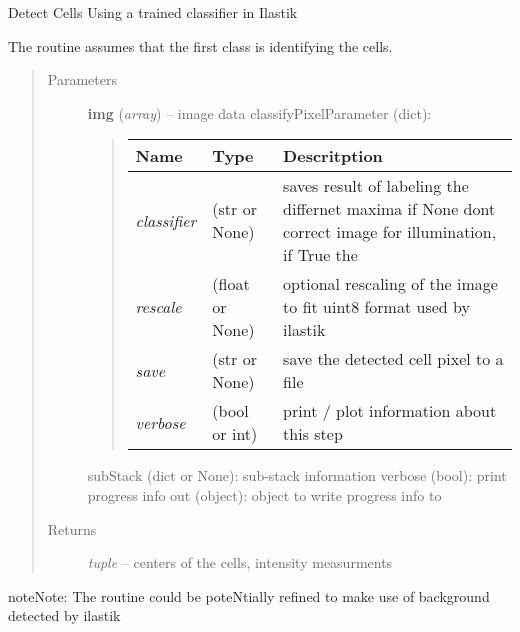 \documentclass[letterpaper,10pt,english]{sphinxmanual}
\begin{document}

\begin{fulllineitems}
\label{api/ClearMap.ImageProcessing:ClearMap.ImageProcessing.IlastikClassification.classifyCells}
Detect Cells Using a trained classifier in Ilastik

The routine assumes that the first class is identifying the cells.
\begin{quote}\begin{description}
\item[{Parameters}] \leavevmode
\textbf{img} (\emph{array}) --
image data
classifyPixelParameter (dict):
\begin{quote}

\begin{tabulary}{\linewidth}{|L|L|L|}
\hline
\textsf{\relax 
Name
} & \textsf{\relax 
Type
} & \textsf{\relax 
Descritption
}\\
\hline
\emph{classifier}
 & 
(str or  None)
 & 
saves result of labeling the differnet maxima
if None dont correct image for illumination, if True the
\\
\hline
\emph{rescale}
 & 
(float or None)
 & 
optional rescaling of the image to fit uint8 format
used by ilastik
\\
\hline
\emph{save}
 & 
(str or None)
 & 
save the detected cell pixel to a file
\\
\hline
\emph{verbose}
 & 
(bool or int)
 & 
print / plot information about this step
\\
\hline\end{tabulary}

\end{quote}

subStack (dict or None): sub-stack information
verbose (bool): print progress info
out (object): object to write progress info to

\item[{Returns}] \leavevmode
\emph{tuple} --
centers of the cells, intensity measurments

\end{description}\end{quote}

\begin{notice}{note}{Note:}
The routine could be poteNtially refined to make use of background
detected by ilastik
\end{notice}

\end{fulllineitems}
\end{document}
